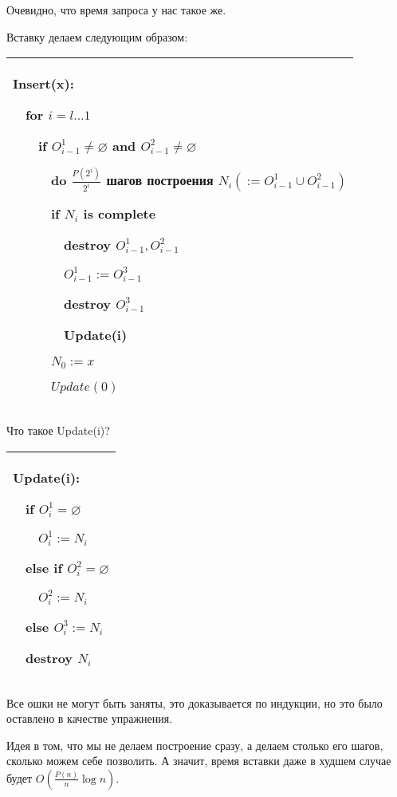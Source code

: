 Очевидно, что время запроса у нас такое же.

Вставку делаем следующим образом:

\begin{tabular}{|p{9cm}|}
    \hline
    Insert(x):

    $\quad$for $i=l \ldots 1$

    $\quad$$\quad$if $O^1_{i-1} \ne \varnothing$ and $O^2_{i-1} \ne \varnothing$

    $\quad$$\quad$$\quad$do $\frac{P(2^i)}{2^i}$ шагов построения $N_i(:=O^1_{i-1}\cup O_{i-1}^2)$

    $\quad$$\quad$$\quad$if $N_i$ is complete

            $\quad$$\quad$$\quad$$\quad$destroy $O_{i-1}^1,O_{i-1}^2$

    $\quad$$\quad$$\quad$$\quad$$O^1_{i-1}:=O_{i-1}^3$

    $\quad$$\quad$$\quad$$\quad$destroy $O_{i-1}^3$


    $\quad$$\quad$$\quad$$\quad$Update(i)

        $\quad$$\quad$$\quad$$N_0:=x$

    $\quad$$\quad$$\quad$$Update(0)$ \\

    \hline
\end{tabular}

Что такое Update(i)?

\begin{tabular}{|p{3cm}|}
    \hline
    Update(i):

    $\quad$if $O^1_i=\varnothing$

    $\quad$$\quad$$O^1_i:=N_i$

    $\quad$else if $O_i^2 = \varnothing$

    $\quad$$\quad$$O_i^2:=N_i$

    $\quad$else $O_i^3:=N_i$

    $\quad$destroy $N_i$ \\

    \hline
\end{tabular}






Все ошки не могут быть заняты, это доказывается по индукции, но это было оставлено в качестве упражнения.

Идея в том, что мы не делаем построение сразу, а делаем столько его шагов, сколько можем себе позволить. А значит, время вставки даже в худшем случае будет $O\left(\frac{P(n)}{n}\log n\right)$.

